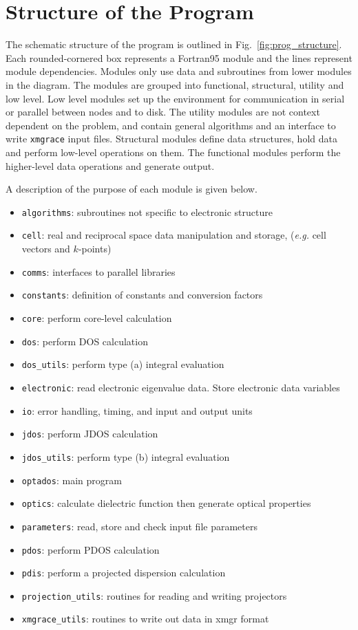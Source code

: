 \documentclass[a4paper,11pt,twoside]{book}
\begin{document}
{%
\chapter{Structure of the Program} \label{sec:structure}
The schematic structure of the program is outlined in Fig.~\ref{fig:prog_structure}.
%
Each rounded-cornered box represents a Fortran95 module and the lines represent module dependencies.
%
Modules only use data and subroutines from lower modules in the diagram.
%
The modules are grouped into functional, structural, utility and low level.
%
Low level modules set up the environment for communication in serial or parallel between nodes and to disk.
%
The utility modules are not context dependent on the problem, and contain general algorithms and an interface to write \texttt{xmgrace} input files.
%
Structural modules define data structures, hold data and perform low-level operations on them.
%
The functional modules perform the higher-level data operations and generate output.

%
A description of the purpose of each module is given below.


\begin{itemize}
\item \texttt{algorithms}: subroutines not specific to electronic structure
\item \texttt{cell}: real and reciprocal space data manipulation and storage, (\emph{e.g.} cell vectors and $k$-points)
\item \texttt{comms}: interfaces to parallel libraries
\item \texttt{constants}: definition of constants and conversion factors
\item \texttt{core}: perform core-level calculation
\item \texttt{dos}: perform DOS calculation
\item \texttt{dos\_utils}: perform type (a) integral evaluation
\item \texttt{electronic}: read electronic eigenvalue data. Store electronic data variables
\item \texttt{io}: error handling, timing, and input and output units
\item \texttt{jdos}: perform JDOS calculation
\item \texttt{jdos\_utils}: perform type (b) integral evaluation
\item \texttt{optados}: main program
\item \texttt{optics}: calculate dielectric function then generate optical properties
\item \texttt{parameters}: read, store and check input file parameters
\item \texttt{pdos}: perform PDOS calculation
\item \texttt{pdis}: perform a projected dispersion calculation
\item \texttt{projection\_utils}: routines for reading and writing projectors
\item \texttt{xmgrace\_utils}: routines to write out data in xmgr format
\end{itemize}

}
\end{document}
